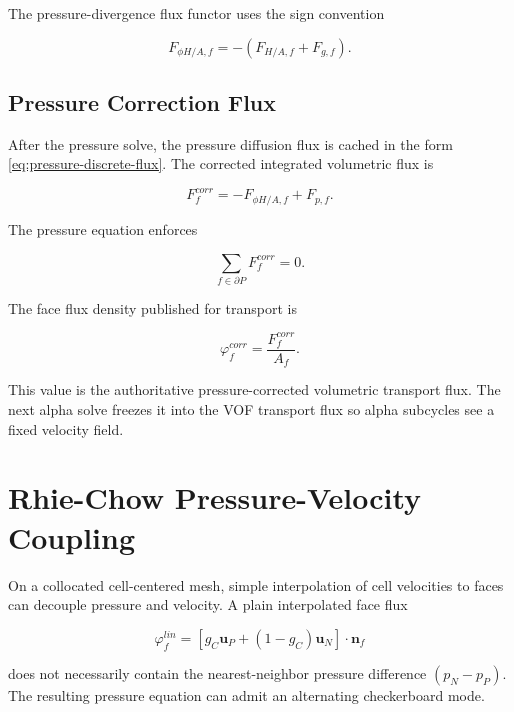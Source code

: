 \documentclass[11pt]{article}
\begin{document}
The pressure-divergence flux functor uses the sign convention

\begin{equation}
  F_{\phi H/A,f}
  =
  -(F_{H/A,f}+F_{g,f}).
  \label{eq:stored-phi-hbya}
\end{equation}

\subsection{Pressure Correction Flux}

After the pressure solve, the pressure diffusion flux is cached in the form
\eqref{eq:pressure-discrete-flux}.  The corrected integrated volumetric flux is

\begin{equation}
  F_f^{corr}
  =
  -F_{\phi H/A,f}
  +
  F_{p,f}.
  \label{eq:corrected-integrated-flux}
\end{equation}

The pressure equation enforces

\begin{equation}
  \sum_{f\in\partial P} F_f^{corr}=0.
  \label{eq:pressure-continuity}
\end{equation}

The face flux density published for transport is

\begin{equation}
  \varphi_f^{corr}=\frac{F_f^{corr}}{A_f}.
\end{equation}

This value is the authoritative pressure-corrected volumetric transport flux.
The next alpha solve freezes it into the VOF transport flux so alpha subcycles
see a fixed velocity field.

\section{Rhie-Chow Pressure-Velocity Coupling}

On a collocated cell-centered mesh, simple interpolation of cell velocities to
faces can decouple pressure and velocity.  A plain interpolated face flux

\begin{equation}
  \varphi_f^{lin}
  =
  \left[
    g_C\mathbf{u}_P+(1-g_C)\mathbf{u}_N
  \right]\cdot\mathbf{n}_f
\end{equation}

does not necessarily contain the nearest-neighbor pressure difference
\((p_N-p_P)\).  The resulting pressure equation can admit an alternating
checkerboard mode.
\end{document}
